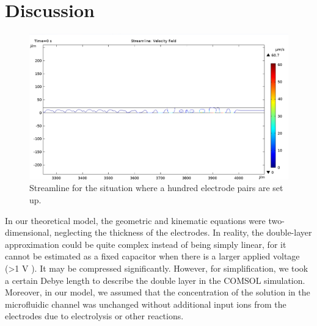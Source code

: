 \documentclass[journal,svgnames,twocolumn,x11names]{IEEEtran}
\begin{document}
\section{Discussion}
\begin{figure}[ht]
    \centering
    \includegraphics[scale=0.7]{100pairs.png}
    \caption{Streamline for the situation where a hundred electrode pairs are set up.}
    \label{fig:100pairs}
\end{figure}
In our theoretical model, the geometric and kinematic equations were two-dimensional, neglecting the thickness of the electrodes. In reality, the double-layer approximation could be quite complex instead of being simply linear, for it cannot be estimated as a fixed capacitor when there is a larger applied voltage (\textgreater 1 V \cite{Brown2000}). It may be compressed significantly. However, for simplification, we took a certain Debye length to describe the double layer in the COMSOL simulation. Moreover, in our model, we assumed that the concentration of the solution in the microfluidic channel was unchanged without additional input ions from the electrodes due to electrolysis or other reactions. 
\end{document}
